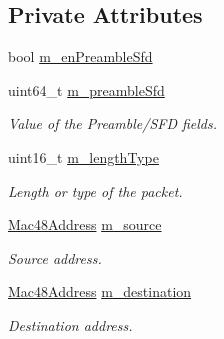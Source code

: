 \subsection*{Private Attributes}
\begin{DoxyCompactItemize}
\item 
bool \hyperlink{classns3_1_1EthernetHeader_a1dfe391d5fce575ed46be576035b5523}{m\+\_\+en\+Preamble\+Sfd}
\item 
uint64\+\_\+t \hyperlink{classns3_1_1EthernetHeader_ab0d0ceb81df7ef3fb6266bef57f43876}{m\+\_\+preamble\+Sfd}
\begin{DoxyCompactList}\small\item\em Value of the Preamble/\+S\+FD fields. \end{DoxyCompactList}\item 
uint16\+\_\+t \hyperlink{classns3_1_1EthernetHeader_a08ce14d49c74d332060686be27aff11f}{m\+\_\+length\+Type}
\begin{DoxyCompactList}\small\item\em Length or type of the packet. \end{DoxyCompactList}\item 
\hyperlink{classns3_1_1Mac48Address}{Mac48\+Address} \hyperlink{classns3_1_1EthernetHeader_a6994cb91754966d155c3c266238530c4}{m\+\_\+source}
\begin{DoxyCompactList}\small\item\em Source address. \end{DoxyCompactList}\item 
\hyperlink{classns3_1_1Mac48Address}{Mac48\+Address} \hyperlink{classns3_1_1EthernetHeader_a2f9cc867b3e38081e05fe7f0dc0cadd1}{m\+\_\+destination}
\begin{DoxyCompactList}\small\item\em Destination address. \end{DoxyCompactList}\end{DoxyCompactItemize}
